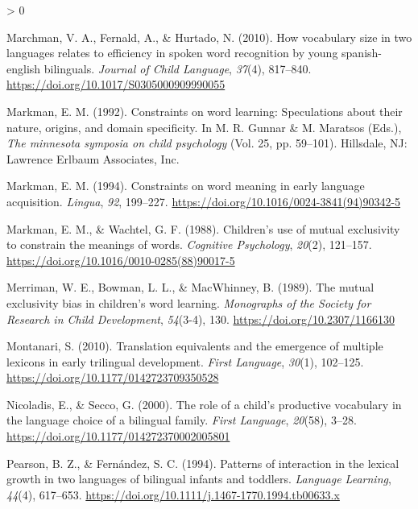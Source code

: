\documentclass[
  english,
  ,man,floatsintext]{apa6}
\newlength{\cslhangindent}
\newenvironment{CSLReferences}[2] %
 {%
  \setlength{\parindent}{0pt}
  \ifodd #1 \everypar{\setlength{\hangindent}{\cslhangindent}}\ignorespaces\fi
  \ifnum #2 > 0
  \setlength{\parskip}{#2\baselineskip}
  \fi
 }%
 {}
\begin{document}
\begin{CSLReferences}{1}{0}
\leavevmode\hypertarget{ref-Marchman_etal_2010}{}%
Marchman, V. A., Fernald, A., \& Hurtado, N. (2010). How vocabulary size in two languages relates to efficiency in spoken word recognition by young spanish-english bilinguals. \emph{Journal of Child Language}, \emph{37}(4), 817--840. \url{https://doi.org/10.1017/S0305000909990055}

\leavevmode\hypertarget{ref-Markman_1992}{}%
Markman, E. M. (1992). Constraints on word learning: Speculations about their nature, origins, and domain specificity. In M. R. Gunnar \& M. Maratsos (Eds.), \emph{The minnesota symposia on child psychology} (Vol. 25, pp. 59--101). Hillsdale, NJ: Lawrence Erlbaum Associates, Inc.

\leavevmode\hypertarget{ref-Markman_1994}{}%
Markman, E. M. (1994). Constraints on word meaning in early language acquisition. \emph{Lingua}, \emph{92}, 199--227. \url{https://doi.org/10.1016/0024-3841(94)90342-5}

\leavevmode\hypertarget{ref-Markman_Wachtel_1988}{}%
Markman, E. M., \& Wachtel, G. F. (1988). Children's use of mutual exclusivity to constrain the meanings of words. \emph{Cognitive Psychology}, \emph{20}(2), 121--157. \url{https://doi.org/10.1016/0010-0285(88)90017-5}

\leavevmode\hypertarget{ref-Merriman_etal_1989}{}%
Merriman, W. E., Bowman, L. L., \& MacWhinney, B. (1989). The mutual exclusivity bias in children's word learning. \emph{Monographs of the Society for Research in Child Development}, \emph{54}(3-4), 130. \url{https://doi.org/10.2307/1166130}

\leavevmode\hypertarget{ref-Montanari_2010}{}%
Montanari, S. (2010). Translation equivalents and the emergence of multiple lexicons in early trilingual development. \emph{First Language}, \emph{30}(1), 102--125. \url{https://doi.org/10.1177/0142723709350528}

\leavevmode\hypertarget{ref-Nicoladis_Secco_2000}{}%
Nicoladis, E., \& Secco, G. (2000). The role of a child's productive vocabulary in the language choice of a bilingual family. \emph{First Language}, \emph{20}(58), 3--28. \url{https://doi.org/10.1177/014272370002005801}

\leavevmode\hypertarget{ref-Pearson_Fernandez_1994}{}%
Pearson, B. Z., \& Fernández, S. C. (1994). Patterns of interaction in the lexical growth in two languages of bilingual infants and toddlers. \emph{Language Learning}, \emph{44}(4), 617--653. \url{https://doi.org/10.1111/j.1467-1770.1994.tb00633.x}


\end{CSLReferences}
\end{document}

